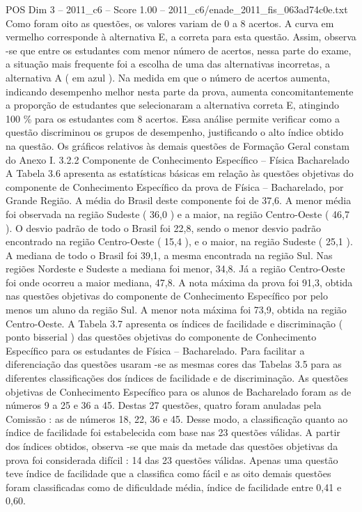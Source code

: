 \begin{textsample}{POS Dim 3 – 2011\_c6 – Score 1.00 – 2011\_c6/enade\_2011\_fis\_063ad74c0e.txt}
Como foram oito as questões, os valores variam de 0 a 8 acertos.
A curva em vermelho corresponde à alternativa E, a correta para esta questão.
Assim, observa -se que entre os estudantes com menor número de acertos, nessa parte do exame, a situação mais frequente foi a escolha de uma das alternativas incorretas, a alternativa A ( em azul ).
Na medida em que o número de acertos aumenta, indicando desempenho melhor nesta parte da prova, aumenta concomitantemente a proporção de estudantes que selecionaram a alternativa correta E, atingindo 100 \% para os estudantes com 8 acertos.
Essa análise permite verificar como a questão discriminou os grupos de desempenho, justificando o alto índice obtido na questão.
Os gráficos relativos às demais questões de Formação Geral constam do Anexo I. 3.2.2 Componente de Conhecimento Específico – Física Bacharelado A Tabela 3.6 apresenta as estatísticas básicas em relação às questões objetivas do componente de Conhecimento Específico da prova de Física – Bacharelado, por Grande Região.
A média do Brasil deste componente foi de 37,6.
A menor média foi observada na região Sudeste ( 36,0 ) e a maior, na região Centro-Oeste ( 46,7 ).
O desvio padrão de todo o Brasil foi 22,8, sendo o menor desvio padrão encontrado na região Centro-Oeste ( 15,4 ), e o maior, na região Sudeste ( 25,1 ).
A mediana de todo o Brasil foi 39,1, a mesma encontrada na região Sul.
Nas regiões Nordeste e Sudeste a mediana foi menor, 34,8.
Já a região Centro-Oeste foi onde ocorreu a maior mediana, 47,8.
A nota máxima da prova foi 91,3, obtida nas questões objetivas do componente de Conhecimento Específico por pelo menos um aluno da região Sul.
A menor nota máxima foi 73,9, obtida na região Centro-Oeste.
A Tabela 3.7 apresenta os índices de facilidade e discriminação ( ponto bisserial ) das questões objetivas do componente de Conhecimento Específico para os estudantes de Física – Bacharelado.
Para facilitar a diferenciação das questões usaram -se as mesmas cores das Tabelas 3.5 para as diferentes classificações dos índices de facilidade e de discriminação.
As questões objetivas de Conhecimento Específico para os alunos de Bacharelado foram as de números 9 a 25 e 36 a 45.
Destas 27 questões, quatro foram anuladas pela Comissão : as de números 18, 22, 36 e 45.
Desse modo, a classificação quanto ao índice de facilidade foi estabelecida com base nas 23 questões válidas.
A partir dos índices obtidos, observa -se que mais da metade das questões objetivas da prova foi considerada difícil : 14 das 23 questões válidas.
Apenas uma questão teve índice de facilidade que a classifica como fácil e as oito demais questões foram classificadas como de dificuldade média, índice de facilidade entre 0,41 e 0,60.

\end{textsample}
